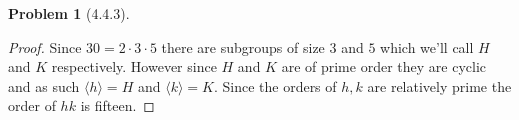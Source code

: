 \documentclass[10pt]{article}
\newcommand{\sk}{\vskip 10mm}
\theoremstyle{plain}
\newtheorem{problem}{Problem}
\theoremstyle{remark}
\begin{document}
\sk

\begin{problem}[4.4.3]
  
\end{problem}

\begin{proof}
  Since $30=2\cdot 3\cdot 5$ there are subgroups of size $3$ and $5$ which we'll
  call $H$ and $K$ respectively. However since $H$ and $K$ are of
  prime order they are cyclic and as such $\langle h\rangle=H$ and $\langle k\rangle= K$. Since
  the orders of $h,k$ are relatively prime the order of $hk$ is fifteen.
\end{proof}

\sk

\end{document}

